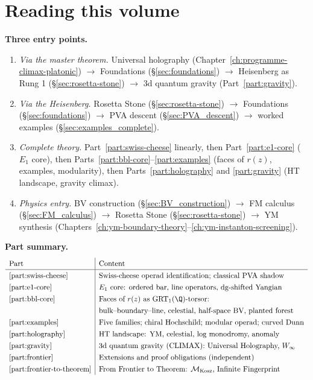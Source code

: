 \section*{Reading this volume}

\noindent\textbf{Three entry points.}
\begin{enumerate}[label=\textup{(\alph*)}]
\item \emph{Via the master theorem.}
 Universal holography (Chapter~\ref{ch:programme-climax-platonic}) $\to$
 Foundations (\S\ref{sec:foundations}) $\to$
 Heisenberg as Rung 1 (\S\ref{sec:rosetta-stone}) $\to$
 3d quantum gravity (Part~\ref{part:gravity}).
\item \emph{Via the Heisenberg.}
 Rosetta Stone (\S\ref{sec:rosetta-stone}) $\to$
 Foundations (\S\ref{sec:foundations}) $\to$
 PVA descent (\S\ref{sec:PVA_descent}) $\to$
 worked examples (\S\ref{sec:examples_complete}).
\item \emph{Complete theory.}
 Part~\ref{part:swiss-cheese} linearly, then
 Part~\ref{part:e1-core} ($E_1$ core), then
 Parts~\ref{part:bbl-core}--\ref{part:examples} (faces of
 $r(z)$, examples, modularity), then Parts~\ref{part:holography}
 and \ref{part:gravity} (HT landscape, gravity climax).
\item \emph{Physics entry.}
 BV construction (\S\ref{sec:BV_construction}) $\to$
 FM calculus (\S\ref{sec:FM_calculus}) $\to$
 Rosetta Stone (\S\ref{sec:rosetta-stone}) $\to$
 YM synthesis (Chapters~\ref{ch:ym-boundary-theory}--\ref{ch:ym-instanton-screening}).
\end{enumerate}

\smallskip
\noindent\textbf{Part summary.}
\[
\renewcommand{\arraystretch}{1.3}
\begin{array}{l|l}
\text{Part} & \text{Content} \\
\hline
\ref{part:swiss-cheese} &
 \text{Swiss-cheese operad identification; classical PVA shadow} \\
\ref{part:e1-core} &
 E_1\text{ core: ordered bar, line operators, dg-shifted Yangian} \\
\ref{part:bbl-core} &
 \text{Faces of } r(z)\text{ as } \mathrm{GRT}_1(\Q)\text{-torsor:} \\
 & \text{bulk--boundary--line, celestial, half-space BV, planted forest} \\
\ref{part:examples} &
 \text{Five families; chiral Hochschild; modular operad; curved Dunn} \\
\ref{part:holography} &
 \text{HT landscape: YM, celestial, log monodromy, anomaly} \\
\ref{part:gravity} &
 \text{3d quantum gravity (CLIMAX): Universal Holography, } W_\infty \\
\ref{part:frontier} &
 \text{Extensions and proof obligations (independent)} \\
\ref{part:frontier-to-theorem} &
 \text{From Frontier to Theorem: } \mathcal{M}_{\mathrm{Kosz}}\text{, Infinite Fingerprint}
\end{array}
\]

